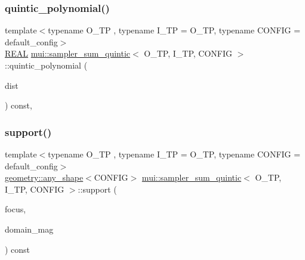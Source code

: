 \subsubsection{\texorpdfstring{quintic\+\_\+polynomial()}{quintic\_polynomial()}}
{\footnotesize\ttfamily template$<$typename O\+\_\+\+TP , typename I\+\_\+\+TP  = O\+\_\+\+TP, typename C\+O\+N\+F\+IG  = default\+\_\+config$>$ \\
\hyperlink{classmui_1_1sampler__sum__quintic_a9cbbc0e8f2384abe39ec2339229b64b6}{R\+E\+AL} \hyperlink{classmui_1_1sampler__sum__quintic}{mui\+::sampler\+\_\+sum\+\_\+quintic}$<$ O\+\_\+\+TP, I\+\_\+\+TP, C\+O\+N\+F\+IG $>$\+::quintic\+\_\+polynomial (\begin{DoxyParamCaption}\item[{const \hyperlink{classmui_1_1sampler__sum__quintic_a9cbbc0e8f2384abe39ec2339229b64b6}{R\+E\+AL}}]{dist }\end{DoxyParamCaption}) const\hspace{0.3cm}{\ttfamily [inline]}, {\ttfamily [protected]}}

\mbox{\label{classmui_1_1sampler__sum__quintic_a20a6fc174d4c0c576f8dca8f190eae1c}} 
\subsubsection{\texorpdfstring{support()}{support()}}
{\footnotesize\ttfamily template$<$typename O\+\_\+\+TP , typename I\+\_\+\+TP  = O\+\_\+\+TP, typename C\+O\+N\+F\+IG  = default\+\_\+config$>$ \\
\hyperlink{classmui_1_1geometry_1_1any__shape}{geometry\+::any\+\_\+shape}$<$C\+O\+N\+F\+IG$>$ \hyperlink{classmui_1_1sampler__sum__quintic}{mui\+::sampler\+\_\+sum\+\_\+quintic}$<$ O\+\_\+\+TP, I\+\_\+\+TP, C\+O\+N\+F\+IG $>$\+::support (\begin{DoxyParamCaption}\item[{\hyperlink{classmui_1_1sampler__sum__quintic_a661c2038a21043ac8e41beeeb07978ad}{point\+\_\+type}}]{focus,  }\item[{\hyperlink{classmui_1_1sampler__sum__quintic_a9cbbc0e8f2384abe39ec2339229b64b6}{R\+E\+AL}}]{domain\+\_\+mag }\end{DoxyParamCaption}) const\hspace{0.3cm}{\ttfamily [inline]}}



